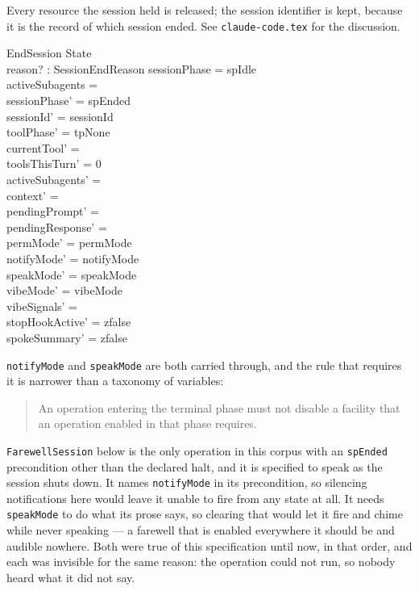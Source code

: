 \documentclass[a4paper,10pt,fleqn]{article}
\begin{document}
Every resource the session held is released; the session identifier is
kept, because it is the record of which session ended. See
\texttt{claude-code.tex} for the discussion.

\begin{schema}{EndSession}
  \Delta State \\
  reason? : SessionEndReason
  \where
  sessionPhase = spIdle \\
  activeSubagents = \emptyset \\
  sessionPhase' = spEnded \\
  sessionId' = sessionId \\
  toolPhase' = tpNone \\
  currentTool' = \emptyset \\
  toolsThisTurn' = 0 \\
  activeSubagents' = \emptyset \\
  context' = \langle \rangle \\
  pendingPrompt' = \emptyset \\
  pendingResponse' = \emptyset \\
  permMode' = permMode \\
  notifyMode' = notifyMode \\
  speakMode' = speakMode \\
  vibeMode' = vibeMode \\
  vibeSignals' = \emptyset \\
  stopHookActive' = zfalse \\
  spokeSummary' = zfalse
\end{schema}

\texttt{notifyMode} and \texttt{speakMode} are both carried through, and
the rule that requires it is narrower than a taxonomy of variables:

\begin{quote}
  An operation entering the terminal phase must not disable a facility
  that an operation enabled in that phase requires.
\end{quote}

\texttt{FarewellSession} below is the only operation in this corpus with
an \texttt{spEnded} precondition other than the declared halt, and it is
specified to speak as the session shuts down. It names
\texttt{notifyMode} in its precondition, so silencing notifications here
would leave it unable to fire from any state at all. It needs
\texttt{speakMode} to do what its prose says, so clearing that would let
it fire and chime while never speaking --- a farewell that is enabled
everywhere it should be and audible nowhere. Both were true of this
specification until now, in that order, and each was invisible for the
same reason: the operation could not run, so nobody heard what it did not
say.
\end{document}
